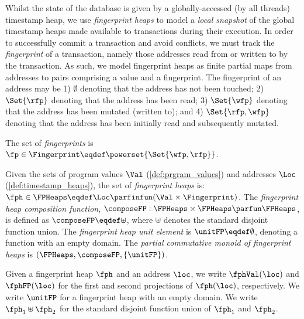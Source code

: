 Whilst the state of the database is given by a globally-accessed (by all threads) timestamp heap, we use \emph{fingerprint heaps} to model a \emph{local snapshot} of the global timestamp heaps made available to transactions during their execution. In order to successfully commit a transaction and avoid conflicts, we must track the \emph{fingerprint} of a transaction, namely those addresses read from or written to by the transaction. As such, we model fingerprint heaps as finite partial maps from addresses to pairs comprising a value and a fingerprint. The fingerprint of an address may be 1) $\emptyset$ denoting that the address has not been touched; 2) $\Set{\rfp}$ denoting that the address has been read; 3) $\Set{\wfp}$ denoting that the address has been mutated (written to); and 4) $\Set{\rfp, \wfp}$ denoting that the address has been initially read and subsequently mutated.   

\begin{definition}\label{def:fingerprint_heaps}
The set of \emph{fingerprints} is $\fp \in \Fingerprint \eqdef \powerset{\Set{\wfp,\rfp}}$.

\noindent Given the sets of program values $\Val$ (\ref{def:prgram_values}) and addresses $\Loc$ (\ref{def:timestamp_heaps}), the set of \emph{fingerprint heaps} is: $\fph \in \FPHeaps \eqdef \Loc \parfinfun (\Val \times \Fingerprint)$.
The \emph{fingerprint heap composition function}, $\composeFP: \FPHeaps \times \FPHeaps \parfun \FPHeaps$, is defined as $\composeFP \eqdef \uplus$, where $\uplus$ denotes the standard disjoint function union. The \emph{fingerprint heap unit element} is $\unitFP \eqdef \emptyset$, denoting a function with an empty domain.
The \emph{partial commutative monoid of fingerprint heaps} is $(\FPHeaps, \composeFP, \{\unitFP\})$.  
\end{definition}
%
Given a fingerprint heap $\fph$ and an address $\loc$, we write $\fphVal(\loc)$ and $\fphFP(\loc)$ for the first and second projections of $\fph(\loc)$, respectively. We write $\unitFP$ for a fingerprint heap with an empty domain. We write $\fph_1 \uplus \fph_2$ for the standard disjoint function union of $\fph_1$ and $\fph_2$. 


